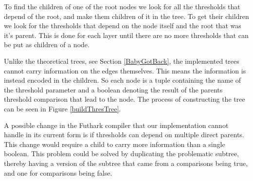 To find the children of one of the root nodes we look for all the thresholds
that depend of the root, and make them children of it in the tree. To get their
children we look for the thresholds that depend on the node itself and the root that
was it's parent. This is done for each layer until there are no more thresholds
that can be put as children of a node.

Unlike the theoretical trees, see Section \ref{BabyGotBack}, the implemented trees cannot carry information on
the edges themselves. This means the information is instead encoded in the
children. So each node is a tuple containing the name of the threshold
parameter and a boolean denoting the result of the parents threshold
comparison that lead to the node. The process of constructing the tree can be seen in Figure \ref{buildThresTree}.


A possible change in the Futhark compiler that our implementation cannot handle
in its current form is if thresholds can depend on multiple direct parents.
This change would require a child to carry more information than a single
boolean. This problem could be solved by duplicating the problematic subtree,
thereby having a version of the subtree that came from a comparisons being
true, and one for comparisons being false.

